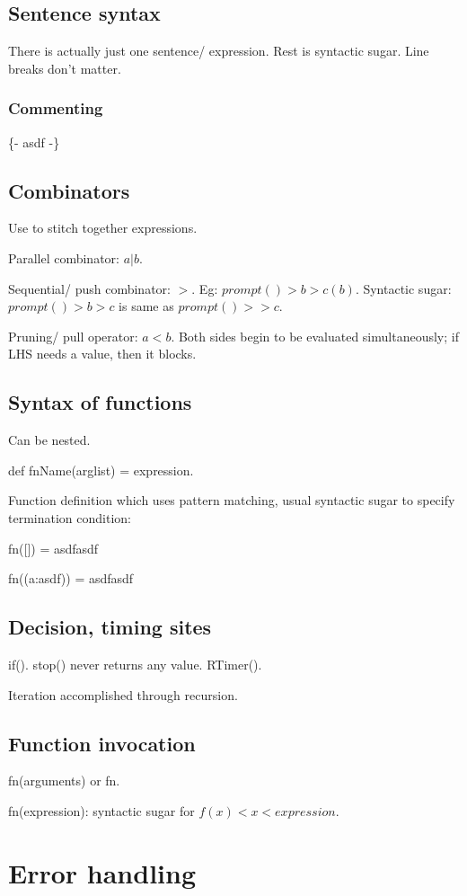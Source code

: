\documentclass[oneside, article]{memoir}
\begin{document}
\subsection{Sentence syntax}
There is actually just one sentence/ expression. Rest is syntactic sugar. Line breaks don't matter.

\subsubsection{Commenting}
\{- asdf -\}

\subsection{Combinators}
Use to stitch together expressions.

Parallel combinator: $a|b$.

Sequential/ push combinator: $>$. Eg: $prompt()>b>c(b)$. Syntactic sugar: $prompt()>b>c$ is same as $prompt()>>c$.

Pruning/ pull operator: $a<b$. Both sides begin to be evaluated simultaneously; if LHS needs a value, then it blocks.

\subsection{Syntax of functions}
Can be nested.

def fnName(arglist) = expression.

Function definition which uses pattern matching, usual syntactic sugar to specify termination condition:

fn([]) = asdfasdf

fn((a:asdf)) = asdfasdf

\subsection{Decision, timing sites}
if(). stop() never returns any value. RTimer().

Iteration accomplished through recursion.

\subsection{Function invocation}
fn(arguments) or fn.

fn(expression): syntactic sugar for $f(x)<x<expression$.

\section{Error handling}
\end{document}
